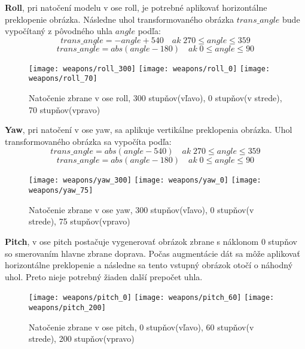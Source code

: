 \textbf{Roll}, pri natočení modelu v ose roll, je potrebné aplikovať horizontálne preklopenie obrázka.
Následne uhol transformovaného obrázka $trans\_angle$ bude vypočítaný z pôvodného uhla $angle$ podľa:
\begin{equation}
    trans\_angle = -angle + 540 \quad ak \; 270 \leq angle \leq 359
\end{equation}
\begin{equation}
    trans\_angle = abs(angle - 180) \quad ak \; 0 \leq angle \leq 90
\end{equation}

\begin{figure}[H]
    \centering
    \texttt{[image: weapons/roll\_300]}
    \quad
    \texttt{[image: weapons/roll\_0]}
    \quad
    \texttt{[image: weapons/roll\_70]}
    \caption{Natočenie zbrane v ose roll, 300 stupňov(vľavo), 0 stupňov(v strede), 70 stupňov(vpravo)}
    \label{pic:rollrotation}
\end{figure}

\textbf{Yaw}, pri natočení v ose yaw, sa aplikuje vertikálne preklopenia obrázka.
Uhol transformovaného obrázka sa vypočíta podľa:
\begin{equation}
    trans\_angle = abs(angle - 540) \quad ak \; 270 \leq angle \leq 359
\end{equation}
\begin{equation}
    trans\_angle = abs(angle - 180) \quad ak \; 0 \leq angle \leq 90
\end{equation}

\begin{figure}[H]
    \centering
    \texttt{[image: weapons/yaw\_300]}
    \quad
    \texttt{[image: weapons/yaw\_0]}
    \quad
    \texttt{[image: weapons/yaw\_75]}
    \caption{Natočenie zbrane v ose yaw, 300 stupňov(vľavo), 0 stupňov(v strede), 75 stupňov(vpravo)}
    \label{pic:yawrotation}
\end{figure}

\textbf{Pitch}, v ose pitch postačuje vygenerovať obrázok zbrane s náklonom 0 stupňov so smerovaním hlavne zbrane doprava.
Počas augmentácie dát sa môže aplikovať horizontálne preklopenie a následne sa tento vstupný obrázok otočí o náhodný uhol.
Preto nieje potrebný žiaden další prepočet uhla.

\begin{figure}[H]
    \centering
    \texttt{[image: weapons/pitch\_0]}
    \quad
    \texttt{[image: weapons/pitch\_60]}
    \quad
    \texttt{[image: weapons/pitch\_200]}
    \caption{Natočenie zbrane v ose pitch, 0 stupňov(vľavo), 60 stupňov(v strede), 200 stupňov(vpravo)}
    \label{pic:yawrotation}
\end{figure}
